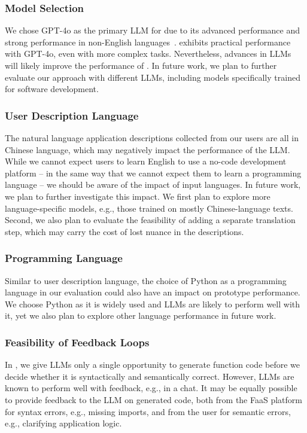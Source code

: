 \subsubsection{Model Selection}
We chose GPT-4o as the primary LLM for \sysname{} due to its advanced performance and strong performance in non-English languages~\cite{openai2024}.
\sysname{} exhibits practical performance with GPT-4o, even with more complex tasks.
Nevertheless, advances in LLMs will likely improve the performance of \sysname{}.
In future work, we plan to further evaluate our approach with different LLMs, including models specifically trained for software development.

\subsubsection{User Description Language}

The natural language application descriptions collected from our users are all in Chinese language, which may negatively impact the performance of the LLM.
While we cannot expect users to learn English to use a no-code development platform -- in the same way that we cannot expect them to learn a programming language -- we should be aware of the impact of input languages.
In future work, we plan to further investigate this impact.
We first plan to explore more language-specific models, e.g., those trained on mostly Chinese-language texts.
Second, we also plan to evaluate the feasibility of adding a separate translation step, which may carry the cost of lost nuance in the descriptions.

\subsubsection{Programming Language}

Similar to user description language, the choice of Python as a programming language in our evaluation could also have an impact on \sysname{} prototype performance.
We choose Python as it is widely used and LLMs are likely to perform well with it, yet we also plan to explore other language performance in future work.

\subsubsection{Feasibility of Feedback Loops}

In \sysname{}, we give LLMs only a single opportunity to generate function code before we decide whether it is syntactically and semantically correct.
However, LLMs are known to perform well with feedback, e.g., in a chat.
It may be equally possible to provide feedback to the LLM on generated code, both from the FaaS platform for syntax errors, e.g., missing imports, and from the user for semantic errors, e.g., clarifying application logic.
